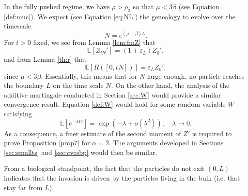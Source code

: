 \documentclass[11pt]{article}
\theoremstyle{plain}
\newcommand\vep{\varepsilon}
\begin{document}
In the fully pushed regime, we have $\rho>\rho_2$ so that $\mu<3\beta$ (see Equation \eqref{def:muc}).  We expect (see Equation \eqref{eq:NL}) the genealogy to evolve over the timescale $$N=e^{(\mu-\beta)L}.$$ 
For $t>0$ fixed, we see from Lemma \ref{lem:fmZ}  that
\begin{equation*}
\mathbb{E}[Z_{tN}']=(1+\vep_L)Z_0',
\end{equation*}
and from Lemma  \ref{th:r}  that $$\mathbb{E}[R([0,tN])]=\vep_L Z_0',$$  
since $\mu<3\beta$. Essentially, this means that for $N$ large enough, no particle reaches the boundary $L$ on the time scale $N$. 
On the other hand, the analysis of the additive martingale conducted in Section \ref{sec:W} would provide a similar convergence result.  Equation \eqref{def:W} would hold
for some random variable $W$ satisfying 
\begin{equation*}
\mathbb{E}\left[e^{-\lambda W}\right]=\exp\left(-\lambda+o(\lambda^2)\right), \quad \lambda \to0.
\end{equation*}
As a consequence, a finer estimate of the second moment of $Z'$ is required to prove Proposition \ref{prop7} for $\alpha=2$.   The arguments developed in Sections \ref{sec:smallts} and \ref{sec:cvcsbp} would then be similar.

From a biological standpoint, the fact that the particles do not exit $(0,L)$ indicates that the invasion is driven by the particles living in the bulk (i.e. that stay far from $L$).




 \renewcommand{\thesubsection}{\Alph{subsection}}
 \setcounter{section}{0}

\setcounter{equation}{0}
\end{document}
